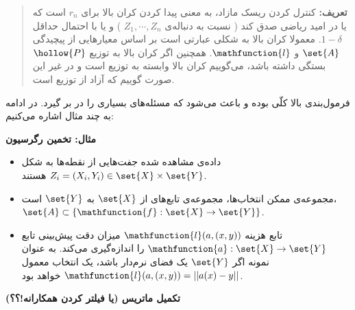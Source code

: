 \begin{quote}
{\bf
تعریف:
} 
کنترل کردن ریسک مازاد، به معنی پیدا کردن کران بالا برای 
$r_n$ 
است که یا در امید ریاضی
صدق کند ( نسبت به دنباله‌ی 
$Z_1,\cdots,Z_n$ 
) و یا با احتمال حداقل 
$1 - \delta$. 
معمولا کران بالا به شکلی عبارتی است بر اساس معیارهایی از پیچیدگی
$\set{A}$ 
و 
$\mathfunction{l}$. 
همچنین اگر کران بالا به توزیع 
$\hollow{P}$ 
بستگی داشته باشد، می‌گوییم کران بالا وابسته به توزیع
است و در غیر این صورت گوییم که آزاد از توزیع
است.

\end{quote}


فرمول‌بندی بالا کلّی بوده و باعث می‌شود که مسئله‌های بسیاری را در بر گیرد. در ادامه به چند مثال اشاره می‌کنیم:

{\bf
مثال: تخمین رگرسیون
} 
\begin{itemize}
\item
داده‌ی مشاهده شده جفت‌هایی از نقطه‌ها به شکل 
$ Z_i = ( X_i, Y_i ) \in \set{X} \times \set{Y} $ 
هستند.


\item
مجموعه‌ی ممکن انتخاب‌ها، مجموعه‌ی تابع‌های از 
$\set{X}$ 
به 
$\set{Y}$ 
است، 
$\set{A} \subset \{ \mathfunction{f} : \set{X} \rightarrow \set{Y} \} $.


\item
تابع هزینه 
$\mathfunction{l}(a, (x,y) )$ 
میزان دقت پیش‌بینی تابع 
$\mathfunction{a}: \set{X} \rightarrow \set{Y}$ 
را اندازه‌گیری می‌کند. به عنوان نمونه اگر 
$\set{Y}$ 
یک فضای نرم‌دار
 باشد، یک انتخاب معمول 
$\mathfunction{l}(a, (x,y)) = || a(x) - y ||$ 
خواهد بود.

\end{itemize}

{\bf
تکمیل ماتریس (یا فیلتر کردن همکارانه!؟؟)
}



























